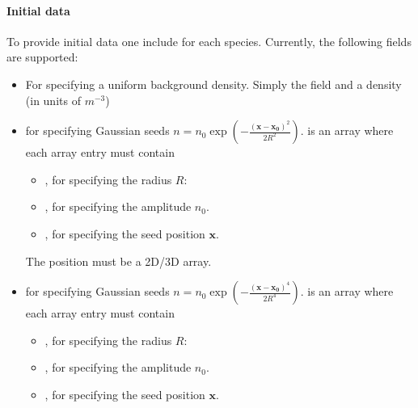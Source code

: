 \documentclass[letterpaper,10pt,english]{sphinxmanual}
\begin{document}
\paragraph{Initial data}
\label{\detokenize{Applications/CdrPlasmaModel:initial-data}}
To provide initial data one include  for each species.
Currently, the following fields are supported:
\begin{itemize}
\item {} 
 For specifying a uniform background density.
Simply the field  and a density (in units of \(m^{-3}\))

\item {} 
 for specifying Gaussian seeds \(n = n_0\exp\left(-\frac{\left(\mathbf{x}-\mathbf{x_0}\right)^2}{2R^2}\right)\).
 is an array where each array entry must contain
\begin{itemize}
\item {} 
, for specifying the radius \(R\):

\item {} 
, for specifying the amplitude \(n_0\).

\item {} 
, for specifying the seed position \(\mathbf{x}\).

\end{itemize}

The position must be a 2D/3D array.

\item {} 
 for specifying Gaussian seeds \(n = n_0\exp\left(-\frac{\left(\mathbf{x}-\mathbf{x_0}\right)^4}{2R^4}\right)\).
 is an array where each array entry must contain
\begin{itemize}
\item {} 
, for specifying the radius \(R\):

\item {} 
, for specifying the amplitude \(n_0\).

\item {} 
, for specifying the seed position \(\mathbf{x}\).

\end{itemize}


\end{itemize}
\end{document}
